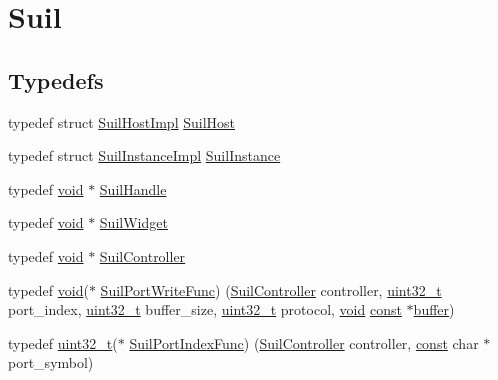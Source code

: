 \hypertarget{group__suil}{}\section{Suil}
\label{group__suil}
\subsection*{Typedefs}
\begin{DoxyCompactItemize}
\item 
typedef struct \hyperlink{struct_suil_host_impl}{Suil\+Host\+Impl} \hyperlink{group__suil_gac10e100afa94a434461386b79528c00c}{Suil\+Host}
\item 
typedef struct \hyperlink{struct_suil_instance_impl}{Suil\+Instance\+Impl} \hyperlink{group__suil_ga767e978a8c5f7c0d5246da79c9b97c6b}{Suil\+Instance}
\item 
typedef \hyperlink{sound_8c_ae35f5844602719cf66324f4de2a658b3}{void} $\ast$ \hyperlink{group__suil_gac9633f3ec108da4fb7ad0b64796f66fa}{Suil\+Handle}
\item 
typedef \hyperlink{sound_8c_ae35f5844602719cf66324f4de2a658b3}{void} $\ast$ \hyperlink{group__suil_ga11e97b978f15e8b4273f3bc59265458f}{Suil\+Widget}
\item 
typedef \hyperlink{sound_8c_ae35f5844602719cf66324f4de2a658b3}{void} $\ast$ \hyperlink{group__suil_gad056063f5a1fafbb2ae1354edf16c21a}{Suil\+Controller}
\item 
typedef \hyperlink{sound_8c_ae35f5844602719cf66324f4de2a658b3}{void}($\ast$ \hyperlink{group__suil_ga2da768960d0b91c1515288387f4e5582}{Suil\+Port\+Write\+Func}) (\hyperlink{group__suil_gad056063f5a1fafbb2ae1354edf16c21a}{Suil\+Controller} controller, \hyperlink{lib-src_2ffmpeg_2win32_2stdint_8h_a6eb1e68cc391dd753bc8ce896dbb8315}{uint32\+\_\+t} port\+\_\+index, \hyperlink{lib-src_2ffmpeg_2win32_2stdint_8h_a6eb1e68cc391dd753bc8ce896dbb8315}{uint32\+\_\+t} buffer\+\_\+size, \hyperlink{lib-src_2ffmpeg_2win32_2stdint_8h_a6eb1e68cc391dd753bc8ce896dbb8315}{uint32\+\_\+t} protocol, \hyperlink{sound_8c_ae35f5844602719cf66324f4de2a658b3}{void} \hyperlink{getopt1_8c_a2c212835823e3c54a8ab6d95c652660e}{const} $\ast$\hyperlink{structbuffer}{buffer})
\item 
typedef \hyperlink{lib-src_2ffmpeg_2win32_2stdint_8h_a6eb1e68cc391dd753bc8ce896dbb8315}{uint32\+\_\+t}($\ast$ \hyperlink{group__suil_ga94e7dc09d4747a1d40f69ff4bef1e242}{Suil\+Port\+Index\+Func}) (\hyperlink{group__suil_gad056063f5a1fafbb2ae1354edf16c21a}{Suil\+Controller} controller, \hyperlink{getopt1_8c_a2c212835823e3c54a8ab6d95c652660e}{const} char $\ast$port\+\_\+symbol)

\end{DoxyCompactItemize}
